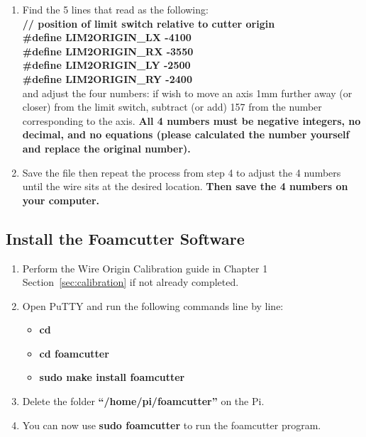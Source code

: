 \documentclass[titlepage,12pt,letter]{report}
\numberwithin{equation}{chapter}
\begin{document}
\begin{enumerate}[noitemsep,topsep=0pt]
\item Find the 5 lines that read as the following:\\
\textbf{// position of limit switch relative to cutter origin}\\
\textbf{\#define LIM2ORIGIN\_LX -4100}\\
\textbf{\#define LIM2ORIGIN\_RX -3550}\\
\textbf{\#define LIM2ORIGIN\_LY -2500}\\
\textbf{\#define LIM2ORIGIN\_RY -2400}\\
and adjust the four numbers: if wish to move an axis 1mm further away (or closer) from the limit switch, subtract (or add) 157 from the number corresponding to the axis. \textbf{All 4 numbers must be negative integers, no decimal, and no equations (please calculated the number yourself and replace the original number).}
\item Save the file then repeat the process from step 4 to adjust the 4 numbers until the wire sits at the desired location. \textbf{Then save the 4 numbers on your computer.}
\end{enumerate}

\subsection{Install the Foamcutter Software}
\label{sec:install}
\begin{enumerate}[noitemsep,topsep=0pt]
\item Perform the Wire Origin Calibration guide in Chapter 1 Section~\ref{sec:calibration} if not already completed.
\item Open PuTTY and run the following commands line by line:
\begin{itemize}[noitemsep,topsep=0pt]
	\item \textbf{cd}
	\item \textbf{cd foamcutter}
	\item \textbf{sudo make install foamcutter}
\end{itemize}
\item Delete the folder \textbf{``/home/pi/foamcutter''} on the Pi.
\item You can now use \textbf{sudo foamcutter} to run the foamcutter program.
\end{enumerate}
\end{document}
